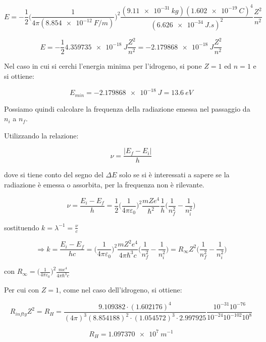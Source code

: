 $$ E = - \frac{1}{2} \biggl(\frac{1}{4\pi (\SI{8.854e-12}{F/m})}\biggr)^2 \frac{(\SI{9.11e-31}{kg}) (\SI{1.602e-19}{C})^4 }{(\SI{6.626e-34}{J.s})^2} \frac{Z^2}{n^2}  $$

$$ E = - \frac{1}{2} \SI{4.359735e-18}{J} \frac{Z^2}{n^2} = - \SI{2.179868e-18}{J} \frac{Z^2}{n^2} $$

Nel caso in cui si cerchi l'energia minima per l'idrogeno, si pone $Z=1$ ed $n=1$ e si ottiene:

$$ E_{min} = \SI{-2.179868e-18}{J} = \SI{13.6}{eV} $$

Possiamo quindi calcolare la frequenza della radiazione emessa nel passaggio da $n_i$ a $n_f$. 

Utilizzando la relazione:

$$\nu = \frac{|E_f - E_i|}{h}$$ 

dove si tiene conto del segno del $\Delta E$ solo se si è interessati a sapere se la radiazione è emessa o assorbita, per la frequenza non è rilevante.

$$ \nu= \frac{E_i-E_f}{h} = \frac{1}{2} \biggl(\frac{1}{4\pi\varepsilon_0}\biggr)^2 \frac{m Z e^4}{\hbar^2} \frac{1}{h} \biggl(\frac{1}{n_f^2} - \frac{1}{n_i^2} \biggr)   $$


sostituendo $k = \lambda^{-1} = \frac{\nu}{c}$ 

$$ \Rightarrow k = \frac{E_i-E_f}{hc} = \biggl(\frac{1}{4\pi\varepsilon_0}\biggr)^2 \frac{m Z^2 e^4}{4\pi\hbar^3 c} \biggl(\frac{1}{n_f^2} - \frac{1}{n_i^2} \biggr) = R_{\infty} Z^2 \biggl(\frac{1}{n_f^2} - \frac{1}{n_i^2} \biggr) $$

con $R_{\infty} =\bigl(\frac{1}{4\pi\varepsilon_0}\bigr)^2 \frac{m e^4}{4\pi\hbar^3 c} $

Per cui con $Z=1$, come nel caso dell'idrogeno, si ottiene:

$$ R_{infty} Z^2 = R_{H} = \frac{9.109382 \cdot (1.602176)^4}{(4\pi)^3 (8.854188)^2 \cdot (1.054572)^3 \cdot 2.997925 } \frac{ 10^{-31} 10^{-76} } { 10^{-24} 10^{-102} 10^{8} }$$

$$ R_{H} = \SI{1.097370e7}{m^{-1}} $$


